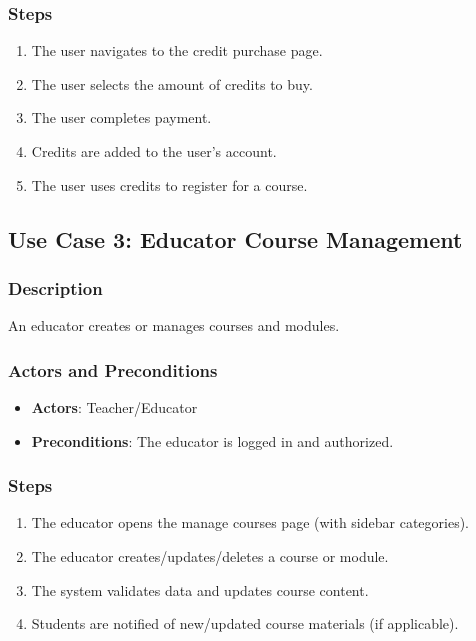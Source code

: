 \documentclass[a4paper, 11pt]{scrreprt}
\begin{document}
\subsubsection{Steps}
\begin{enumerate}
    \item The user navigates to the credit purchase page.
    \item The user selects the amount of credits to buy.
    \item The user completes payment.
    \item Credits are added to the user’s account.
    \item The user uses credits to register for a course.
\end{enumerate}

\subsection{Use Case 3: Educator Course Management}
\subsubsection{Description}
An educator creates or manages courses and modules.

\subsubsection{Actors and Preconditions}
\begin{itemize}
    \item \textbf{Actors}: Teacher/Educator
    \item \textbf{Preconditions}: The educator is logged in and authorized.
\end{itemize}

\subsubsection{Steps}
\begin{enumerate}
    \item The educator opens the manage courses page (with sidebar categories).
    \item The educator creates/updates/deletes a course or module.
    \item The system validates data and updates course content.
    \item Students are notified of new/updated course materials (if applicable).
\end{enumerate}
\end{document}
